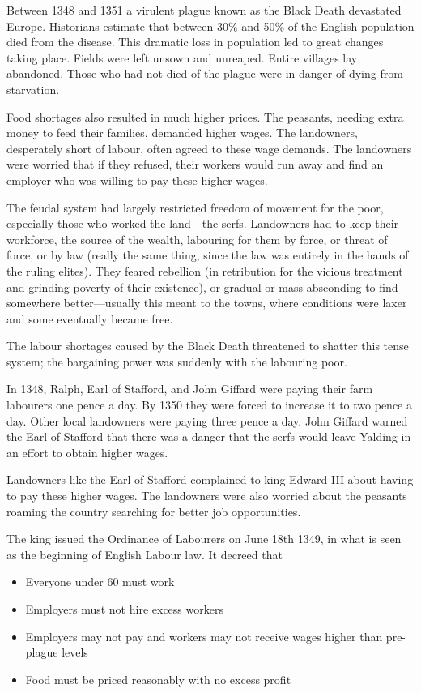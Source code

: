 \documentclass[
  letterpaper,
  11pt,
  DIV=9,
  openright]{scrbook}
\providecommand{\tightlist}{%
  \setlength{\itemsep}{0pt}\setlength{\parskip}{0pt}}
\begin{document}
Between 1348 and 1351 a virulent plague known as the Black Death
devastated Europe. Historians estimate that between 30\% and 50\% of the
English population died from the disease. This dramatic loss in
population led to great changes taking place. Fields were left unsown
and unreaped. Entire villages lay abandoned. Those who had not died of
the plague were in danger of dying from starvation.

Food shortages also resulted in much higher prices. The peasants,
needing extra money to feed their families, demanded higher wages. The
landowners, desperately short of labour, often agreed to these wage
demands. The landowners were worried that if they refused, their workers
would run away and find an employer who was willing to pay these higher
wages.

The feudal system had largely restricted freedom of movement for the
poor, especially those who worked the land---the serfs. Landowners had
to keep their workforce, the source of the wealth, labouring for them by
force, or threat of force, or by law (really the same thing, since the
law was entirely in the hands of the ruling elites). They feared
rebellion (in retribution for the vicious treatment and grinding poverty
of their existence), or gradual or mass absconding to find somewhere
better---usually this meant to the towns, where conditions were laxer
and some eventually became free.

The labour shortages caused by the Black Death threatened to shatter
this tense system; the bargaining power was suddenly with the labouring
poor.

In 1348, Ralph, Earl of Stafford, and John Giffard were paying their
farm labourers one pence a day. By 1350 they were forced to increase it
to two pence a day. Other local landowners were paying three pence a
day. John Giffard warned the Earl of Stafford that there was a danger
that the serfs would leave Yalding in an effort to obtain higher wages.

Landowners like the Earl of Stafford complained to king Edward III about
having to pay these higher wages. The landowners were also worried about
the peasants roaming the country searching for better job opportunities.

The king issued the Ordinance of Labourers on June 18th 1349, in what is
seen as the beginning of English Labour law. It decreed that

\begin{itemize}
\tightlist
\item
  Everyone under 60 must work
\item
  Employers must not hire excess workers
\item
  Employers may not pay and workers may not receive wages higher than
  pre-plague levels
\item
  Food must be priced reasonably with no excess profit
\end{itemize}
\end{document}
